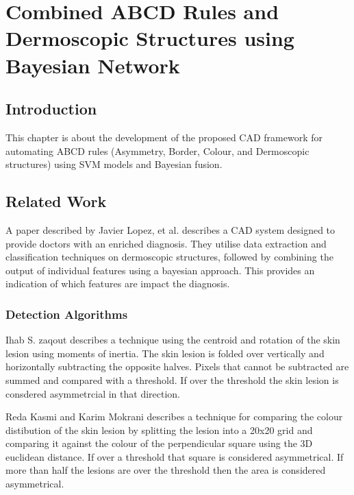 \chapter{Combined ABCD Rules and Dermoscopic Structures using Bayesian Network}

\section{Introduction}
This chapter is about the development of the proposed CAD framework for automating ABCD rules (Asymmetry, Border, Colour, and Dermoscopic structures) using SVM models and Bayesian fusion.

\section{Related Work}
A paper described by Javier Lopez, et al.\cite{Lopez-Labraca2018} describes a CAD system designed to provide doctors with an enriched diagnosis. They utilise data extraction and classification techniques on dermoscopic structures, followed by combining the output of individual features using a bayesian approach. This provides an indication of which features are impact the diagnosis.

\subsection{Detection Algorithms}
Ihab S. zaqout\cite{Zaqout2016} describes a technique using the centroid and rotation of the skin lesion using moments of inertia. The skin lesion is folded over vertically and horizontally subtracting the opposite halves. Pixels that cannot be subtracted are summed and compared with a threshold. If over the threshold the skin lesion is consdered asymmetrcial in that direction.

Reda Kasmi and Karim Mokrani\cite{Kasmi2016} describes a technique for comparing the colour distibution of the skin lesion by splitting the lesion into a 20x20 grid and comparing it against the colour of the perpendicular square using the 3D euclidean distance. If over a threshold that square is considered asymmetrical. If more than half the lesions are over the threshold then the area is considered asymmetrical.


